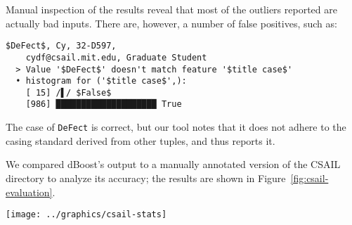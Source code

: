 Manual inspection of the results reveal that most of the outliers reported are actually bad inputs. There are, however, a number of false positives, such as:

\begin{lstlisting}[gobble=2]
  $DeFect$, Cy, 32-D597,
    cydf@csail.mit.edu, Graduate Student
  > Value '$DeFect$' doesn't match feature '$title case$'
  • histogram for ('$title case$',):
    [ 15] /▌/ $False$
    [986] ████████████████████ True
\end{lstlisting}

The case of \lstinline{DeFect} is correct, but our tool notes that it does not adhere to the casing standard derived from other tuples, and thus reports it.

We compared dBoost's output to a manually annotated version of the CSAIL directory to analyze its accuracy; the results are shown in Figure~\ref{fig:csail-evaluation}.

\begin{figure*}
  \texttt{[image: ../graphics/csail-stats]}
  \caption{Accuracy of dBoost on the CSAIL dataset. Outliers were detected using $\theta = 0.9$ and $\epsilon = 0.075$; the tuples are sorted according to why they are -- or are flagged as -- outliers.}
  \label{fig:csail-evaluation}
\end{figure*}